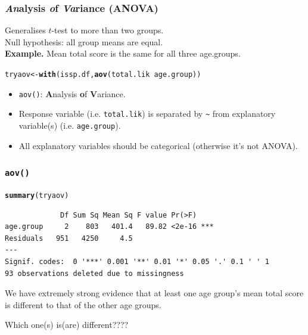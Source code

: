 \documentclass{beamer}\usepackage[]{graphicx}\usepackage[]{color}
\makeatletter
\newcommand{\hlopt}[1]{\textcolor[rgb]{0,0,0}{#1}}%
\newcommand{\hlstd}[1]{\textcolor[rgb]{0.345,0.345,0.345}{#1}}%
\newcommand{\hlkwb}[1]{\textcolor[rgb]{0.69,0.353,0.396}{#1}}%
\newcommand{\hlkwd}[1]{\textcolor[rgb]{0.737,0.353,0.396}{\textbf{#1}}}%
\newenvironment{kframe}{%
 \def\at@end@of@kframe{}%
 \ifinner\ifhmode%
  \def\at@end@of@kframe{\end{minipage}}%
  \begin{minipage}{\columnwidth}%
 \fi\fi%
 \def\FrameCommand##1{\hskip\@totalleftmargin \hskip-\fboxsep
 \colorbox{shadecolor}{##1}\hskip-\fboxsep
     \hskip-\linewidth \hskip-\@totalleftmargin \hskip\columnwidth}%
 \MakeFramed {\advance\hsize-\width
   \@totalleftmargin\z@ \linewidth\hsize
   \@setminipage}}%
 {\par\unskip\endMakeFramed%
 \at@end@of@kframe}
\newenvironment{knitrout}{}{} %
\makeatother
\begin{document}
\begin{frame}[fragile]
  \frametitle{\textit{\textbf{An}}alysis \textit{\textbf{o}}f \textit{\textbf{Va}}riance (ANOVA)}
Generalises $t$-test to more than two groups.\\
\vspace{2mm}
Null hypothesis: all group means are equal.\\
\vspace{2mm}
{\bf Example.} Mean total score is the same for all three age.groups.
\begin{knitrout}
\color{fgcolor}\begin{kframe}
\begin{alltt}
\hlstd{tryaov} \hlkwb{<-} \hlkwd{with}\hlstd{(issp.df,} \hlkwd{aov}\hlstd{(total.lik}\hlopt{~}\hlstd{age.group))}
\end{alltt}
\end{kframe}
\end{knitrout}
\begin{itemize}
\item \texttt{aov()}: \textbf{A}nalysis \textbf{o}f \textbf{V}ariance.
\item Response variable (i.e. \texttt{total.lik}) is separated by
  \texttt{\~} from explanatory variable(s) (i.e. \texttt{age.group}).
\item All explanatory variables should be categorical (otherwise it's
  not ANOVA).
\end{itemize} 
\end{frame}

\begin{frame}[fragile]
\frametitle{\texttt{aov()}}
\begin{knitrout}
\color{fgcolor}\begin{kframe}
\begin{alltt}
\hlkwd{summary}\hlstd{(tryaov)}
\end{alltt}
\begin{verbatim}
             Df Sum Sq Mean Sq F value Pr(>F)    
age.group     2    803   401.4   89.82 <2e-16 ***
Residuals   951   4250     4.5                   
---
Signif. codes:  0 '***' 0.001 '**' 0.01 '*' 0.05 '.' 0.1 ' ' 1
93 observations deleted due to missingness
\end{verbatim}
\end{kframe}
\end{knitrout}
We have extremely strong evidence that at least one age group's mean total score is different to that of the other age groups.\\\vspace{0.3cm}

Which one(s) is(are) different????
\end{frame}
\end{document}
